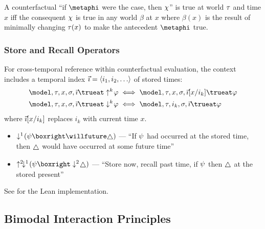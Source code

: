 \documentclass[../LogosReference.tex]{subfiles}
\begin{document}
\begin{remark}
	A counterfactual ``if $\metaphi$ were the case, then $\chi$'' is true at world $\tau$ and time $x$
	iff the consequent $\chi$ is true in any world $\beta$ at $x$ where $\beta(x)$ is the result of minimally changing $\tau(x)$ to make the antecedent $\metaphi$ true.
\end{remark}

\subsubsection{Store and Recall Operators}

\begin{definition}\label{def:store-recall-truth}
	For cross-temporal reference within counterfactual evaluation, the context includes a temporal index $\vec{\imath} = \langle i_1, i_2, \ldots \rangle$ of stored times:
	\begin{align}
		\model, \history, x, \assignment, \tempindex \trueat \store{k}\metaA  & \iff \model, \history, x, \assignment, \tempindex[x/i_k] \trueat \metaA \\
		\model, \history, x, \assignment, \tempindex \trueat \recall{k}\metaA & \iff \model, \history, i_k, \assignment, \tempindex \trueat \metaA
	\end{align}
	where $\vec{\imath}[x/i_k]$ replaces $i_k$ with current time $x$.
\end{definition}

\begin{example}
	\begin{itemize}
		\item $\recall{1}(\metaB \boxright \willfuture\always)$ --- ``If $\psi$ had occurred at the stored time, then $\always$ would have occurred at some future time''
		\item $\store{2}\recall{1}(\metaB \boxright \recall{2}\always)$ --- ``Store now, recall past time, if $\psi$ then $\always$ at the stored present''
	\end{itemize}
\end{example}

See  for the Lean implementation.


\subsection{Bimodal Interaction Principles}\label{sec:bimodal-interaction}
\end{document}

